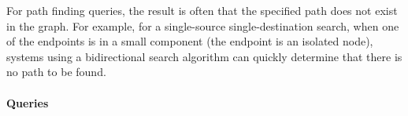 
For path finding queries, the result is often that the specified path does not exist in the graph.
For example, for a single-source single-destination search, when one of the endpoints is in a small component (\eg the endpoint is an isolated node), systems using a bidirectional search algorithm can quickly determine that there is no path to be found.


\paragraph{Queries}
{\raggedright

}